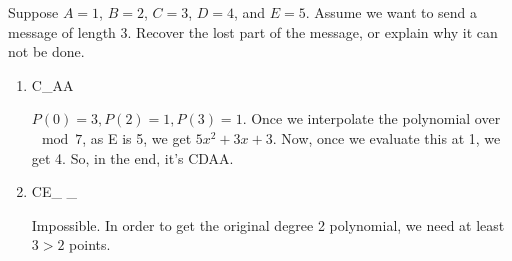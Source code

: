 \question Suppose $A = 1$, $B = 2$, $C = 3$, $D = 4$, and $E = 5$. 
Assume we want to send a message of length 3. Recover the lost part 
of the message, or explain why it can not be done. 
\begin{enumerate}
\item C\_AA
\begin{solution}[1in]
$P(0) = 3, P(2) = 1, P(3) = 1$.  Once we interpolate the polynomial 
over $\mod 7$, as E is 5, we get $5x^2 + 3x + 3$. Now, once we evaluate 
this at 1, we get 4. So, in the end, it’s CDAA.
\end{solution}
\item CE\_ \_
\begin{solution}[1in]
Impossible. In order to get the original degree 2 polynomial, we 
need at least $3 > 2$ points. 
\end{solution}
\end{enumerate}